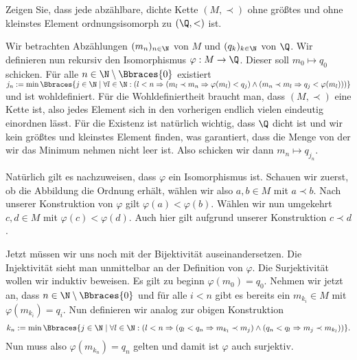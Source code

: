 \begin{exercise}
    Zeigen Sie, dass jede abzählbare, dichte Kette $(M, \prec)$ ohne größtes und ohne kleinstes Element ordnungsisomorph zu $(\Q, <)$ ist.
\end{exercise}
\begin{solution}
    Wir betrachten Abzählungen $(m_n)_{n \in \N}$ von $M$ und $(q_k)_{k \in \N}$ von $\Q$. Wir definieren nun rekursiv den Isomorphismus $\varphi: M \to \Q$. Dieser soll $m_0 \mapsto q_0$ schicken. Für alle $n \in \N \setminus \Bbraces{0}$ existiert $j_n := \min\Bbraces{j \in \N \mid \forall l \in \N: (l < n \Rightarrow (m_l \prec m_n \Rightarrow \varphi(m_l) < q_j) \land (m_n \prec m_l \Rightarrow q_j < \varphi(m_l) ) )}$ und ist wohldefiniert. Für die Wohldefiniertheit braucht man, dass $(M, \prec)$ eine Kette ist, also jedes Element sich in den vorherigen endlich vielen eindeutig einordnen lässt. Für die Existenz ist natürlich wichtig, dass $\Q$ dicht ist und wir kein größtes und kleinstes Element finden, was garantiert, dass die Menge von der wir das Minimum nehmen nicht leer ist. Also schicken wir dann $m_n \mapsto q_{j_n}$.
    
    Natürlich gilt es nachzuweisen, dass $\varphi$ ein Isomorphismus ist. Schauen wir zuerst, ob die Abbildung die Ordnung erhält, wählen wir also $a,b \in M$ mit $a \prec b$. Nach unserer Konstruktion von $\varphi$ gilt $\varphi(a) < \varphi(b)$. Wählen wir nun umgekehrt $c,d \in M$ mit $\varphi(c) < \varphi(d)$. Auch hier gilt aufgrund unserer Konstruktion $c \prec d$. 

    Jetzt müssen wir uns noch mit der Bijektivität auseinandersetzen. Die Injektivität sieht man unmittelbar an der Definition von $\varphi$. Die Surjektivität wollen wir induktiv beweisen. Es gilt zu beginn $\varphi(m_0) = q_0$. Nehmen wir jetzt an, dass $n \in \N \setminus \Bbraces{0}$ und für alle $i < n$ gibt es bereits ein $m_{k_i} \in M$ mit $\varphi(m_{k_i}) = q_i$. Nun definieren wir analog zur obigen Konstruktion
    \begin{align*}
        k_n :=  \min\Bbraces{j \in \N \mid \forall l \in \N: (l < n \Rightarrow (q_l < q_n \Rightarrow m_{k_l} \prec m_j) \land (q_n < q_l \Rightarrow m_j \prec m_{k_l} ) )} .
    \end{align*}
    Nun muss also $\varphi(m_{k_n}) = q_n$ gelten und damit ist $\varphi$ auch surjektiv.
\end{solution}